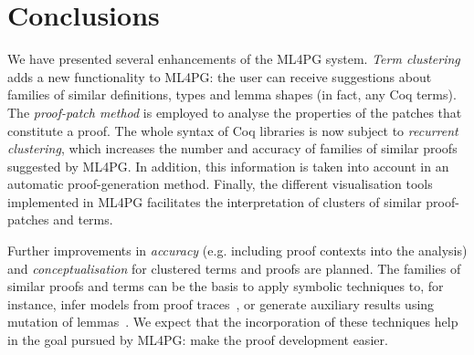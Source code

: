 \section{Conclusions}\label{sec:conclusions}

We have presented several enhancements of the ML4PG system. \emph{Term clustering} adds a new
functionality to ML4PG: the user can receive suggestions about families of similar definitions, types and lemma shapes (in fact, any Coq terms).
The \emph{proof-patch method} is employed to analyse the properties of the patches that constitute a proof. The whole syntax of Coq libraries is now subject to \emph{recurrent clustering}, which
 increases the number and accuracy of families of similar proofs suggested by ML4PG. In addition, this information is taken into account in an automatic proof-generation method. Finally, the different visualisation tools implemented in ML4PG facilitates the interpretation of clusters of similar proof-patches and terms.

Further improvements in \emph{accuracy} (e.g. including proof contexts into the analysis) and \emph{conceptualisation} for clustered terms and proofs are planned. The families of similar proofs and terms can be the basis to
apply symbolic techniques to, for instance, infer models from proof traces~\cite{GNR14}, or generate auxiliary results using
mutation of lemmas~\cite{lpar13}. We expect that the incorporation of these techniques help in the goal pursued by ML4PG: make the
proof development easier.
